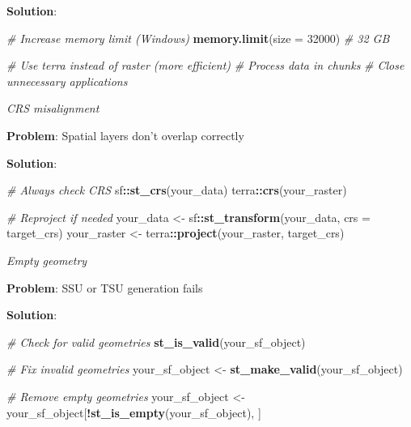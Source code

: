 \documentclass[
  10pt,
  b5paper,
  oneside]{book}
\newenvironment{Shaded}{\begin{snugshade}}{\end{snugshade}}
\newcommand{\AttributeTok}[1]{\textcolor[rgb]{0.13,0.29,0.53}{#1}}
\newcommand{\CommentTok}[1]{\textcolor[rgb]{0.56,0.35,0.01}{\textit{#1}}}
\newcommand{\DecValTok}[1]{\textcolor[rgb]{0.00,0.00,0.81}{#1}}
\newcommand{\FunctionTok}[1]{\textcolor[rgb]{0.13,0.29,0.53}{\textbf{#1}}}
\newcommand{\NormalTok}[1]{#1}
\newcommand{\OtherTok}[1]{\textcolor[rgb]{0.56,0.35,0.01}{#1}}
\newcommand{\SpecialCharTok}[1]{\textcolor[rgb]{0.81,0.36,0.00}{\textbf{#1}}}
\begin{document}
\textbf{Solution}:

\begin{Shaded}
\begin{Highlighting}[]
\CommentTok{\# Increase memory limit (Windows)}
\FunctionTok{memory.limit}\NormalTok{(}\AttributeTok{size =} \DecValTok{32000}\NormalTok{)  }\CommentTok{\# 32 GB}

\CommentTok{\# Use terra instead of raster (more efficient)}
\CommentTok{\# Process data in chunks}
\CommentTok{\# Close unnecessary applications}
\end{Highlighting}
\end{Shaded}

\emph{CRS misalignment}

\textbf{Problem}: Spatial layers don't overlap correctly

\textbf{Solution}:

\begin{Shaded}
\begin{Highlighting}[]
\CommentTok{\# Always check CRS}
\NormalTok{sf}\SpecialCharTok{::}\FunctionTok{st\_crs}\NormalTok{(your\_data)}
\NormalTok{terra}\SpecialCharTok{::}\FunctionTok{crs}\NormalTok{(your\_raster)}

\CommentTok{\# Reproject if needed}
\NormalTok{your\_data }\OtherTok{\textless{}{-}}\NormalTok{ sf}\SpecialCharTok{::}\FunctionTok{st\_transform}\NormalTok{(your\_data, }\AttributeTok{crs =}\NormalTok{ target\_crs)}
\NormalTok{your\_raster }\OtherTok{\textless{}{-}}\NormalTok{ terra}\SpecialCharTok{::}\FunctionTok{project}\NormalTok{(your\_raster, target\_crs)}
\end{Highlighting}
\end{Shaded}

\emph{Empty geometry}

\textbf{Problem}: SSU or TSU generation fails

\textbf{Solution}:

\begin{Shaded}
\begin{Highlighting}[]
\CommentTok{\# Check for valid geometries}
\FunctionTok{st\_is\_valid}\NormalTok{(your\_sf\_object)}

\CommentTok{\# Fix invalid geometries}
\NormalTok{your\_sf\_object }\OtherTok{\textless{}{-}} \FunctionTok{st\_make\_valid}\NormalTok{(your\_sf\_object)}

\CommentTok{\# Remove empty geometries}
\NormalTok{your\_sf\_object }\OtherTok{\textless{}{-}}\NormalTok{ your\_sf\_object[}\SpecialCharTok{!}\FunctionTok{st\_is\_empty}\NormalTok{(your\_sf\_object), ]}
\end{Highlighting}
\end{Shaded}
\end{document}
